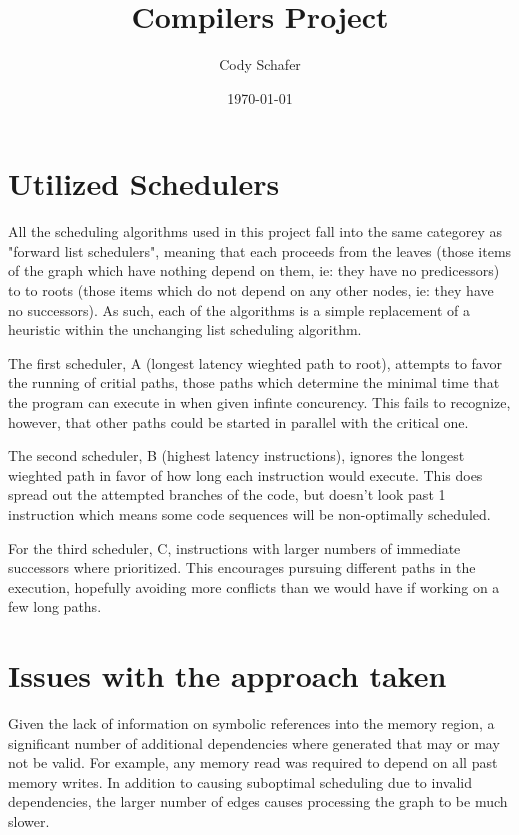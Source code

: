 \documentclass{article}
\title{Compilers Project}
\author{Cody Schafer}
\date{\today}
\begin{document}
\maketitle
{}


\section{Utilized Schedulers}

All the scheduling algorithms used in this project fall into the same categorey as "forward list schedulers", meaning that each proceeds from the leaves (those items of the graph which have nothing depend on them, ie: they have no predicessors) to to roots (those items which do not depend on any other nodes, ie: they have no successors). As such, each of the algorithms is a simple replacement of a heuristic within the unchanging list scheduling algorithm.

The first scheduler, A (longest latency wieghted path to root), attempts to favor the running of critial paths, those paths which determine the minimal time that the program can execute in when given infinte concurency. This fails to recognize, however, that other paths could be started in parallel with the critical one.

The second scheduler, B (highest latency instructions), ignores the longest wieghted path in favor of how long each instruction would execute. This does spread out the attempted branches of the code, but doesn't look past 1 instruction which means some code sequences will be non-optimally scheduled.

For the third scheduler, C, instructions with larger numbers of immediate successors where prioritized. This encourages pursuing different paths in the execution, hopefully avoiding more conflicts than we would have if working on a few long paths.

\section{Issues with the approach taken}

Given the lack of information on symbolic references into the memory region, a significant number of additional dependencies where generated that may or may not be valid. For example, any memory read was required to depend on all past memory writes. In addition to causing suboptimal scheduling due to invalid dependencies, the larger number of edges causes processing the graph to be much slower.
\end{document}

